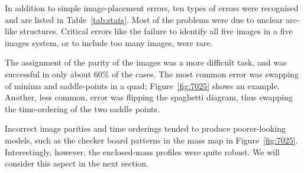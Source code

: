 \documentclass[usenatbib]{mn2e}
\newcommand{\figref}[1]{Figure~\ref{fig:#1}}
\newcommand{\tabref}[1]{Table~\ref{tab:#1}}
\begin{document}
In addition to simple image-placement errors, ten types of errors were
recognised and are listed in \tabref{stats}.  Most of the problems
were due to unclear arc-like structures.  Critical errors like the
failure to identify all five images in a five images system, or to
include too many images, were rare.

The assignment of the parity of the images was a more difficult task,
and was successful in only about 60\% of the cases.  The most common
error was swapping of minima and saddle-points in a quad;
\figref{7025} shows an example.  Another, less common, error was
flipping the spaghetti diagram, thus swapping the time-ordering of the
two saddle points.

Incorrect image parities and time orderings tended to produce
poorer-looking models, such as the checker board patterns in the mass
map in \figref{7025}.  Interestingly, however, the enclosed-mass
profiles were quite robust.  We will consider this aspect in the next
section.

\FloatBarrier
\end{document}
